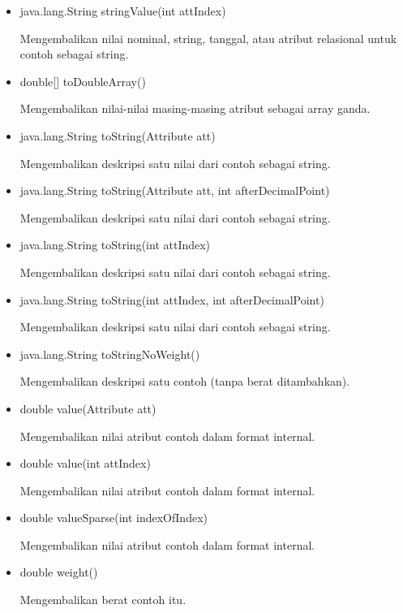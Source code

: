\begin{itemize}
	\item java.lang.String stringValue(int attIndex)
	
	Mengembalikan nilai nominal, string, tanggal, atau atribut relasional untuk contoh sebagai string.
	
	\item double[] toDoubleArray()
	
	Mengembalikan nilai-nilai masing-masing atribut sebagai array ganda.
	
	\item java.lang.String toString(Attribute att)
	
	Mengembalikan deskripsi satu nilai dari contoh sebagai string.
	
	\item java.lang.String toString(Attribute att, int afterDecimalPoint)
	
	Mengembalikan deskripsi satu nilai dari contoh sebagai string.
	
	\item java.lang.String toString(int attIndex)
	
	Mengembalikan deskripsi satu nilai dari contoh sebagai string.
	
	\item java.lang.String toString(int attIndex, int afterDecimalPoint)
	
	Mengembalikan deskripsi satu nilai dari contoh sebagai string.
	
	\item java.lang.String toStringNoWeight()
	
	Mengembalikan deskripsi satu contoh (tanpa berat ditambahkan).
	
	\item double value(Attribute att)
	
	Mengembalikan nilai atribut contoh dalam format internal.
	
	\item double value(int attIndex)
	
	Mengembalikan nilai atribut contoh dalam format internal.
	
	\item double valueSparse(int indexOfIndex)
	
	Mengembalikan nilai atribut contoh dalam format internal.
	
	\item double weight()
	
	Mengembalikan berat contoh itu.
\end{itemize}

